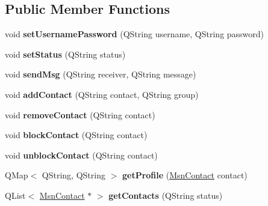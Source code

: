 \subsection*{Public Member Functions}
\begin{DoxyCompactItemize}
\item 
\hypertarget{classMsn_aae02bad6846b3aff0753a57d04046ca4}{
void {\bfseries setUsernamePassword} (QString username, QString password)}
\label{classMsn_aae02bad6846b3aff0753a57d04046ca4}

\item 
\hypertarget{classMsn_a721ff6d8bbec8fec1ea1f57cbf0ab2d0}{
void {\bfseries setStatus} (QString status)}
\label{classMsn_a721ff6d8bbec8fec1ea1f57cbf0ab2d0}

\item 
\hypertarget{classMsn_a20f729ae9af9b6a0635233793290da82}{
void {\bfseries sendMsg} (QString receiver, QString message)}
\label{classMsn_a20f729ae9af9b6a0635233793290da82}

\item 
\hypertarget{classMsn_ae6bad5afb2a66233a86e3e24c944c5d9}{
void {\bfseries addContact} (QString contact, QString group)}
\label{classMsn_ae6bad5afb2a66233a86e3e24c944c5d9}

\item 
\hypertarget{classMsn_a98ba30441700908d47ba797396d510cc}{
void {\bfseries removeContact} (QString contact)}
\label{classMsn_a98ba30441700908d47ba797396d510cc}

\item 
\hypertarget{classMsn_aa9d0b35905dd05487873e3232b91f98d}{
void {\bfseries blockContact} (QString contact)}
\label{classMsn_aa9d0b35905dd05487873e3232b91f98d}

\item 
\hypertarget{classMsn_a32813babfc06cfd8bbaaa1c7efa77acc}{
void {\bfseries unblockContact} (QString contact)}
\label{classMsn_a32813babfc06cfd8bbaaa1c7efa77acc}

\item 
\hypertarget{classMsn_a802bf36e77f75e53e29a5cf4e9b2a5c6}{
QMap$<$ QString, QString $>$ {\bfseries getProfile} (\hyperlink{classMsnContact}{MsnContact} contact)}
\label{classMsn_a802bf36e77f75e53e29a5cf4e9b2a5c6}

\item 
\hypertarget{classMsn_ab13250da6eae22c6a489cefadad474c5}{
QList$<$ \hyperlink{classMsnContact}{MsnContact} $\ast$ $>$ {\bfseries getContacts} (QString status)}
\label{classMsn_ab13250da6eae22c6a489cefadad474c5}


\end{DoxyCompactItemize}
